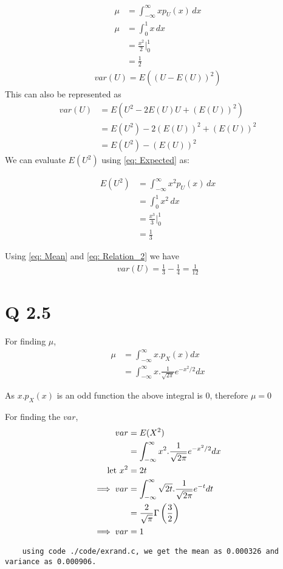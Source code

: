 \documentclass[journal,12pt,twocolumn]{IEEEtran}
\begin{document}
\begin{align}
    \mu &= \int_{-\infty}^{\infty} x p_U(x) \,dx\label{eq:Relation_1}\\
		\mu &= \int_{0}^{1} x \,dx \\
		&= \frac{x^2}{2} \big|^{1}_{0} \\
		&= \frac{1}{2} 	\label{eq: Mean}
\end{align}
\begin{align}
    var(U) = E((U - E(U))^2)
\end{align}
This can also be represented as
\begin{align}
		var(U) &= E(U^2 - 2E(U)U + (E(U))^2) \\
		&= E(U^2) - 2(E(U))^2 + (E(U))^2 \\
		&= E(U^2) - (E(U))^2
		\label{eq: Relation_2}
\end{align}
We can evaluate $E(U^2)$ using \eqref{eq: Expected} as:
	
\begin{align}
    	E(U^2) &= \int_{-\infty}^{\infty} x^2 p_U(x) \,dx \\
    	&= \int_{0}^{1} x^2 \,dx \\
    	&= \frac{x^3}{3} \big|^{1}_{0} \\
    	&= \frac{1}{3}
\end{align}

    Using \eqref{eq: Mean} and \eqref{eq: Relation_2} we have
\begin{align}
    	var(U) = \frac{1}{3} - \frac{1}{4} = \frac{1}{12}
\end{align}


\section {Q 2.5}
For finding $\mu$,
\begin{align}
    \mu &= \int _ {- \infty} ^ {\infty} {x . p_X(x) dx} \\
    &= \int _ {- \infty} ^ {\infty} {x . \frac{1}{\sqrt{2 \pi}} e^{-x^2 / 2} dx}
\end{align}

As $x . p_X(x)$ is an odd function the above integral is $0$, therefore $\mu = 0$

For finding the $var$,
\begin{align}
    var &= E(X^2) \\
    &= \int _ {- \infty} ^ {\infty} {x^2 . \frac{1}{\sqrt{2 \pi}} e^{-x^2 / 2} dx} \\
    \text{let\,\,} x^2 &= 2t \\
    \implies var &= \int _ {- \infty} ^ {\infty} {\sqrt{2t} . \frac{1}{\sqrt{2\pi}} e^{-t} dt} \\
    &= \frac{2}{\sqrt{\pi}} \Gamma \left(\frac{3}{2}\right) \\
    \implies var &= 1
\end{align}
\begin{lstlisting}
    using code ./code/exrand.c, we get the mean as 0.000326 and variance as 0.000906.
\end{lstlisting}
\end{document}
